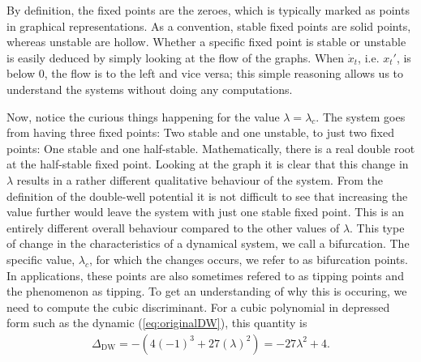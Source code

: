 By definition, the fixed points are the zeroes, which is typically marked as points in graphical representations. As a convention, stable fixed points are solid points, whereas unstable are hollow. Whether a specific fixed point is stable or unstable is easily deduced by simply looking at the flow of the graphs. When $\dot{x}_t$, i.e. $x_t'$, is below 0, the flow is to the left and vice versa; this simple reasoning allows us to understand the systems without doing any computations.

Now, notice the curious things happening for the value $\lambda = \lambda_c$. The system goes from having three fixed points: Two stable and one unstable, to just two fixed points: One stable and one half-stable. Mathematically, there is a real double root at the half-stable fixed point. Looking at the graph it is clear that this change in $\lambda$ results in a rather different qualitative behaviour of the system. From the definition of the double-well potential it is not difficult to see that increasing the value further would leave the system with just one stable fixed point. This is an entirely different overall behaviour compared to the other values of $\lambda$. This type of change in the characteristics of a dynamical system, we call a bifurcation. The specific value, $\lambda_c$, for which the changes occurs, we refer to as bifurcation points.\cite{Strogatz2019_gv} In applications, these points are also sometimes refered to as tipping points and the phenomenon as tipping.
To get an understanding of why this is occuring, we need to compute the cubic discriminant. For a cubic polynomial in depressed form such as the dynamic (\ref{eq:originalDW}), this quantity is
\begin{align}
    \Delta_{\mathrm{DW}} = -\left(4(-1)^3+27\left(\lambda\right)^2\right) = -27\lambda^2 + 4. \label{eq:DW_discriminant}
\end{align} 
